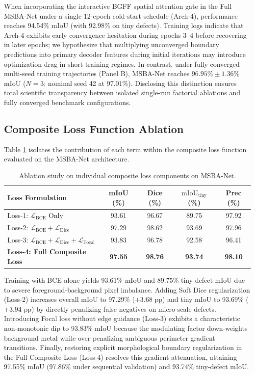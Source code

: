 \documentclass{ieeeaccess}
\begin{document}
When incorporating the interactive BGFF spatial attention gate in the Full MSBA-Net under a single 12-epoch cold-start schedule (Arch-4), performance reaches 94.54\% mIoU (with 92.98\% on tiny defects). Training logs indicate that Arch-4 exhibits early convergence hesitation during epochs 3--4 before recovering in later epochs; we hypothesize that multiplying unconverged boundary predictions into primary decoder features during initial iterations may introduce optimization drag in short training regimes. In contrast, under fully converged multi-seed training trajectories (Panel B), MSBA-Net reaches $96.95\% \pm 1.36\%$ mIoU ($N=3$; nominal seed 42 at 97.01\%). Disclosing this distinction ensures total scientific transparency between isolated single-run factorial ablations and fully converged benchmark configurations.

\subsection{Composite Loss Function Ablation}
Table \ref{tab:loss_ablation} isolates the contribution of each term within the composite loss function evaluated on the MSBA-Net architecture.

\begin{table}[!t]
\centering
\setlength{\tabcolsep}{1.8pt}
\fontsize{6.8pt}{8.8pt}\selectfont
\caption{Ablation study on individual composite loss components on MSBA-Net.}
\label{tab:loss_ablation}
\begin{tabular*}{\columnwidth}{@{\extracolsep{\fill}}lcccc@{}}
\toprule
\textbf{Loss Formulation} & \textbf{mIoU (\%)} & \textbf{Dice (\%)} & $\text{mIoU}_{\text{tiny}}$ \textbf{(\%)} & \textbf{Prec (\%)} \\
\midrule
Loss-1: $\mathcal{L}_{\text{BCE}}$ Only & 93.61 & 96.67 & 89.75 & 97.92 \\
Loss-2: $\mathcal{L}_{\text{BCE}} + \mathcal{L}_{\text{Dice}}$ & 97.29 & 98.62 & 93.69 & 97.96 \\
Loss-3: $\mathcal{L}_{\text{BCE}} + \mathcal{L}_{\text{Dice}} + \mathcal{L}_{\text{Focal}}$ & 93.83 & 96.78 & 92.58 & 96.41 \\
\textbf{Loss-4: Full Composite Loss} & \textbf{97.55} & \textbf{98.76} & \textbf{93.74} & \textbf{98.10} \\
\bottomrule
\end{tabular*}
\end{table}

Training with BCE alone yields 93.61\% mIoU and 89.75\% tiny-defect mIoU due to severe foreground-background pixel imbalance. Adding Soft Dice regularization (Loss-2) increases overall mIoU to 97.29\% ($+3.68\text{ pp}$) and tiny mIoU to 93.69\% ($+3.94\text{ pp}$) by directly penalizing false negatives on micro-scale defects. Introducing Focal loss without edge guidance (Loss-3) exhibits a characteristic non-monotonic dip to 93.83\% mIoU because the modulating factor down-weights background metal while over-penalizing ambiguous perimeter gradient transitions. Finally, restoring explicit morphological boundary regularization in the Full Composite Loss (Loss-4) resolves this gradient attenuation, attaining 97.55\% mIoU (97.86\% under sequential validation) and 93.74\% tiny-defect mIoU.
\end{document}
